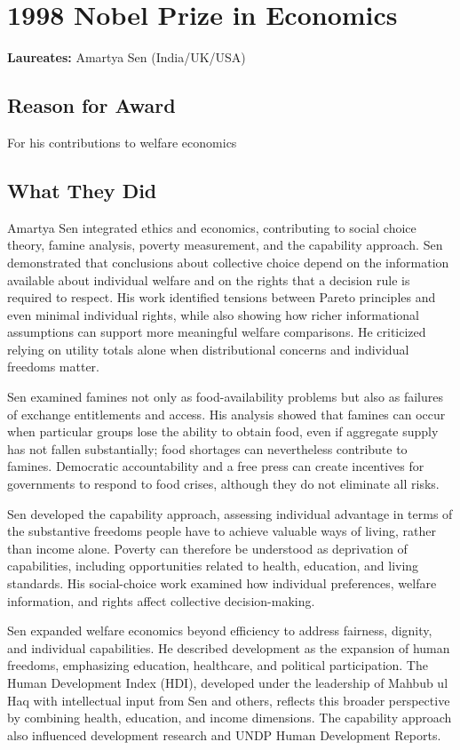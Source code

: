 \chapter{1998 Nobel Prize in Economics}
\textbf{Laureates: }Amartya Sen (India/UK/USA)

\section*{Reason for Award}
For his contributions to welfare economics

\section{What They Did}
Amartya Sen integrated ethics and economics, contributing to social choice theory,
famine analysis, poverty measurement, and the capability approach. Sen demonstrated
that conclusions about collective choice depend on the information available about
individual welfare and on the rights that a decision rule is required to respect.
His work identified tensions between Pareto principles and even minimal individual
rights, while also showing how richer informational assumptions can support more
meaningful welfare comparisons. He criticized relying on utility totals alone when
distributional concerns and individual freedoms matter.

Sen examined famines not only as food-availability problems but also as failures
of exchange entitlements and access. His analysis showed that famines can occur
when particular groups lose the ability to obtain food, even if aggregate supply
has not fallen substantially; food shortages can nevertheless contribute to
famines. Democratic accountability and a free press can create incentives for
governments to respond to food crises, although they do not eliminate all risks.

Sen developed the capability approach, assessing individual advantage in terms of
the substantive freedoms people have to achieve valuable ways of living, rather
than income alone. Poverty can therefore be understood as deprivation of
capabilities, including opportunities related to health, education, and living
standards. His social-choice work examined how individual preferences, welfare
information, and rights affect collective decision-making.

Sen expanded welfare economics beyond efficiency to address fairness, dignity,
and individual capabilities. He described development as the expansion of human
freedoms, emphasizing education, healthcare, and political participation. The
Human Development Index (HDI), developed under the leadership of Mahbub ul Haq
with intellectual input from Sen and others, reflects this broader perspective by
combining health, education, and income dimensions. The capability approach also
influenced development research and UNDP Human Development Reports.

